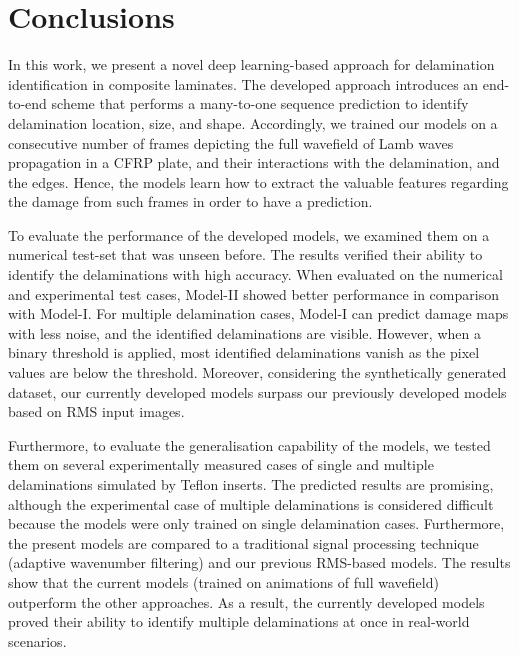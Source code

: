 \section{Conclusions}
\label{conclusion}
\begin{sloppypar}
	In this work, we present a novel deep learning-based approach for delamination identification in composite laminates.
	The developed approach introduces an end-to-end scheme that performs a many-to-one sequence prediction to identify delamination location, size, and shape.
	Accordingly, we trained our models on a consecutive number of frames depicting the full wavefield of Lamb waves propagation in a CFRP plate, and their interactions with the delamination, and the edges.
	Hence, the models learn how to extract the valuable features regarding the damage from such frames in order to have a prediction.
	
	To evaluate the performance of the developed models, we examined them on a numerical test-set that was unseen before.
	The results verified their ability to identify the delaminations with high accuracy. 
	When evaluated on the numerical and experimental test cases, Model-II showed better performance in comparison with Model-I.
	For multiple delamination cases, Model-I can predict damage maps with less noise, and the identified delaminations are visible.
	However, when a binary threshold is applied, most identified delaminations vanish as the pixel values are below the threshold.
	Moreover, considering the synthetically generated dataset, our currently developed models surpass our previously developed models based on RMS input images.
	
	Furthermore, to evaluate the generalisation capability of the models, we tested them on several experimentally measured cases of single and multiple delaminations simulated by Teflon inserts.
	The predicted results are promising, although the experimental case of multiple delaminations is considered difficult because the models were only trained on single delamination cases. 
	Furthermore, the present models are compared to a traditional signal processing technique (adaptive wavenumber filtering) and our previous RMS-based models. 
	The results show that the current models (trained on animations of full wavefield) outperform the other approaches.
	As a result, the currently developed models proved their ability to identify multiple delaminations at once in real-world scenarios.
	

\end{sloppypar}
